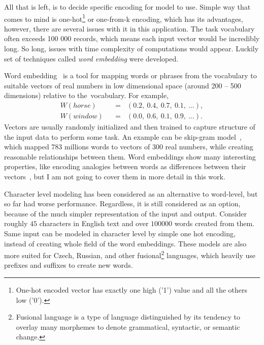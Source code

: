 All that is left, is to decide specific encoding for model to use.  Simple way that comes to mind is one-hot\footnote{One-hot encoded vector has exactly one high ('1') value and all the others low ('0').} or one-from-k encoding, which has its advantages, however, there are several issues with it in this application. The task vocabulary often exceeds 100 000 records, which means each input vector would be incredibly long. So long, issues with time complexity of computations would appear. Luckily set of techniques called \emph{word embedding} were developed. 

Word embedding~\cite{bengio2003neural} is a tool for mapping words or phrases from the vocabulary to suitable vectors of real numbers in low dimensional space (around 200 -- 500 dimensions) relative to the~vocabulary. For example,
\begin{align}
W(horse) \hspace{7pt}&=\hspace{7pt} (0.2,\ 0.4,\ 0.7,\ 0.1,\ \dots), \label{eq:embed1}\\
W(window) \hspace{7pt}&=\hspace{7pt} (0.0,\ 0.6,\ 0.1,\ 0.9,\ \dots). \label{eq:embed2}
\end{align}
Vectors are usually randomly initialized and then trained to capture structure of the input data to perform some task. An example can be skip-gram model~\cite{DBLP:journals/corr/abs-1301-3781}, which mapped 783 millions words to vectors of 300 real numbers, while creating reasonable relationships between them. Word embeddings show many interesting properties, like encoding analogies between words as differences between their vectors~\cite{export:189726}, but I am not going to cover them in more detail in this work.

Character level modeling has been considered as an alternative to word-level, but so far had worse performance. Regardless, it is still considered as an option, because of the much simpler representation of  the input and output. Consider roughly $ 45 $ characters in English text and over $ 100 000 $ words created from them. Same input can be modeled in character level by simple one hot encoding, instead of creating whole field of the word embeddings. These models are also more suited for Czech, Russian, and other fusional\footnote{Fusional language is a type of language distinguished by its tendency to overlay many morphemes to denote grammatical, syntactic, or semantic change.} languages, which heavily use prefixes and suffixes to create new words. 

